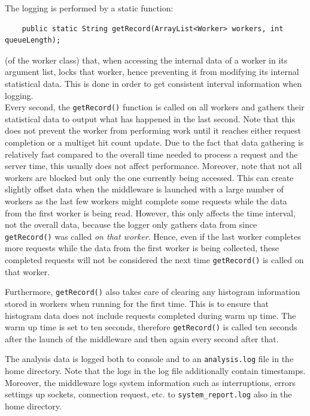 \documentclass[11pt,a4paper]{article}
\begin{document}
The logging is performed by a static function:
\begin{verbatim}
    public static String getRecord(ArrayList<Worker> workers, int queueLength);
\end{verbatim}
(of the worker class) that, when accessing the internal data of a worker in its argument list, locks that worker, hence preventing it from modifying its internal statistical data. This is done in order to get consistent interval information when logging. \\
Every second, the \texttt{getRecord()} function is called on all workers and gathers their statistical data to output what has happened in the last second. Note that this does not prevent the worker from performing work until it reaches either request completion or a multiget hit count update. Due to the fact that data gathering is relatively fast compared to the overall time needed to process a request and the server time, this usually does not affect performance. Moreover, note that not all workers are blocked but only the one currently being accessed. This can create slightly offset data when the middleware is launched with a large number of workers as the last few workers might complete some requests while the data from the first worker is being read. However, this only affects the time interval, not the overall data, because the logger only gathers data from since \texttt{getRecord()} was called \textit{on that worker}. Hence, even if the last worker completes more requests while the data from the first worker is being collected, these completed requests will not be considered the next time \texttt{getRecord()} is called on that worker.

Furthermore, \texttt{getRecord()} also takes care of clearing any histogram information stored in workers when running for the first time. This is to ensure that histogram data does not include requests completed during warm up time. The warm up time is set to ten seconds, therefore \texttt{getRecord()} is called ten seconds after the launch of the middleware and then again every second after that.

The analysis data is logged both to console and to an \texttt{analysis.log} file in the home directory. Note that the logs in the log file additionally contain timestamps. Moreover, the middleware logs system information such as interruptions, errors settings up sockets, connection request, etc. to \texttt{system_report.log} also in the home directory.
\end{document}

